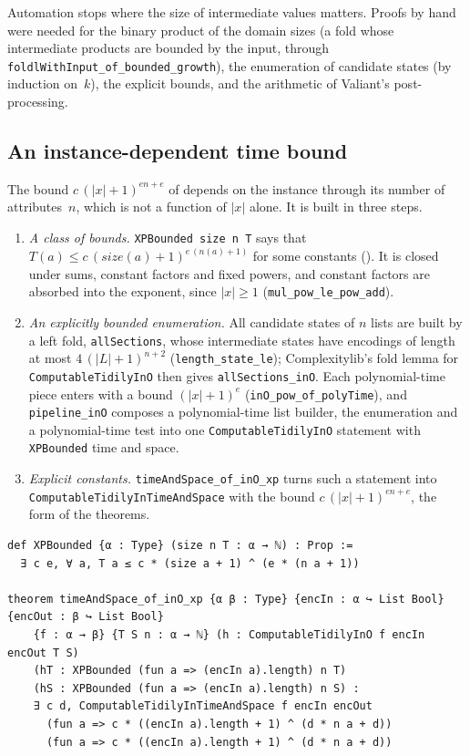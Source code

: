 \documentclass[pdflatex,sn-mathphys-num]{sn-jnl}
\theoremstyle{thmstyleone}
\theoremstyle{thmstylethree}
\begin{document}
Automation stops where the size of intermediate values matters. Proofs by hand were needed for
the binary product of the domain sizes (a fold whose intermediate products are bounded by the
input, through \lstinline{foldlWithInput_of_bounded_growth}), the enumeration of candidate
states (by induction on~$k$), the explicit bounds, and the arithmetic of Valiant's
post-processing.

\subsection{An instance-dependent time bound}
\label{sec:instance-bounds}

The bound $c\,(|x|+1)^{en+e}$ of  depends on the instance through its number
of attributes~$n$, which is not a function of $|x|$ alone. It is built in three steps.
\begin{enumerate}
\item \emph{A class of bounds.} \lstinline{XPBounded size n T} says that
  $T(a) \le c\,(\mathit{size}(a)+1)^{e\,(n(a)+1)}$ for some constants (). It is
  closed under sums, constant factors and fixed powers, and constant factors are absorbed into
  the exponent, since $|x| \ge 1$ (\lstinline{mul_pow_le_pow_add}).
\item \emph{An explicitly bounded enumeration.} All candidate states of $n$ lists are built by a
  left fold, \lstinline{allSections}, whose intermediate states have encodings of length at most
  $4\,(|L|+1)^{n+2}$ (\lstinline{length_state_le}); Complexitylib's fold lemma for
  \lstinline{ComputableTidilyInO} then gives \lstinline{allSections_inO}. Each polynomial-time
  piece enters with a bound $(|x|+1)^{e}$ (\lstinline{inO_pow_of_polyTime}), and
  \lstinline{pipeline_inO} composes a polynomial-time list builder, the enumeration and a
  polynomial-time test into one \lstinline{ComputableTidilyInO} statement with
  \lstinline{XPBounded} time and space.
\item \emph{Explicit constants.} \lstinline{timeAndSpace_of_inO_xp} turns such a statement into
  \lstinline{ComputableTidilyInTimeAndSpace} with the bound $c\,(|x|+1)^{e n + e}$, the form of
  the theorems.
\end{enumerate}

\begin{lstlisting}[float=t,caption={The class of bounds, and the step to explicit constants (\texttt{ExplicitDegree.lean}; statements only). The hypothesis \texttt{h} has a hidden constant factor; the conclusion has none.},label={lst:xp}]
def XPBounded {α : Type} (size n T : α → ℕ) : Prop :=
  ∃ c e, ∀ a, T a ≤ c * (size a + 1) ^ (e * (n a + 1))

theorem timeAndSpace_of_inO_xp {α β : Type} {encIn : α ↪ List Bool} {encOut : β ↪ List Bool}
    {f : α → β} {T S n : α → ℕ} (h : ComputableTidilyInO f encIn encOut T S)
    (hT : XPBounded (fun a => (encIn a).length) n T)
    (hS : XPBounded (fun a => (encIn a).length) n S) :
    ∃ c d, ComputableTidilyInTimeAndSpace f encIn encOut
      (fun a => c * ((encIn a).length + 1) ^ (d * n a + d))
      (fun a => c * ((encIn a).length + 1) ^ (d * n a + d))
\end{lstlisting}
\end{document}
